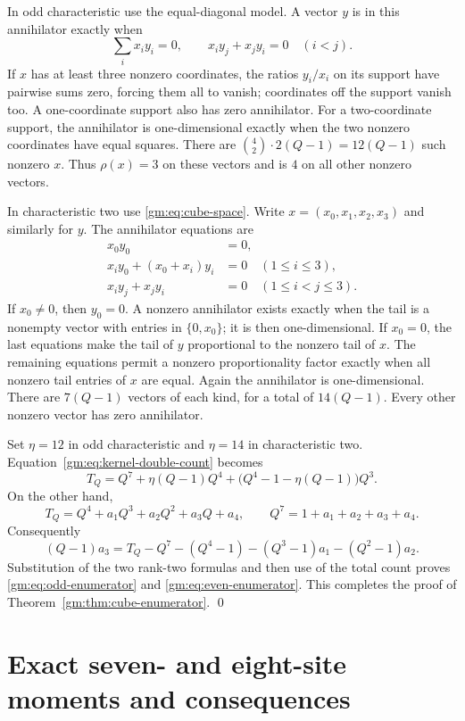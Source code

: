 \documentclass[11pt,a4paper]{article}
\numberwithin{equation}{section}
\theoremstyle{definition}
\theoremstyle{remark}
\newcommand{\1}{\mathbf 1}
\begin{document}
In odd characteristic use the equal-diagonal model. A vector $y$ is in
this annihilator exactly when
\[
 \sum_i x_i y_i=0,\qquad x_i y_j+x_j y_i=0\quad(i<j).
\]
If $x$ has at least three nonzero coordinates, the ratios $y_i/x_i$
on its support have pairwise sums zero, forcing them all to vanish;
coordinates off the support vanish too. A one-coordinate support also
has zero annihilator. For a two-coordinate support, the annihilator is
one-dimensional exactly when the two nonzero coordinates have equal
squares. There are $\binom42\cdot2(Q-1)=12(Q-1)$ such nonzero $x$.
Thus $\rho(x)=3$ on these vectors and is $4$ on all other nonzero vectors.

In characteristic two use \eqref{gm:eq:cube-space}. Write
$x=(x_0,x_1,x_2,x_3)$ and similarly for $y$. The annihilator equations are
\begin{align*}
 x_0y_0&=0,\\
 x_i y_0+(x_0+x_i)y_i&=0\quad(1\leq i\leq3),\\
 x_i y_j+x_j y_i&=0\quad(1\leq i<j\leq3).
\end{align*}
If $x_0\ne0$, then $y_0=0$. A nonzero annihilator exists exactly when the
tail is a nonempty vector with entries in $\{0,x_0\}$; it is then
one-dimensional. If $x_0=0$, the last equations make the tail of $y$
proportional to the nonzero tail of $x$. The remaining equations permit
a nonzero proportionality factor exactly when all nonzero tail entries
of $x$ are equal. Again the annihilator is one-dimensional. There are
$7(Q-1)$ vectors of each kind, for a total of $14(Q-1)$. Every other
nonzero vector has zero annihilator.

Set $\eta=12$ in odd characteristic and $\eta=14$ in characteristic two.
Equation~\eqref{gm:eq:kernel-double-count} becomes
\begin{equation}\label{gm:eq:kernel-moment-value}
 T_Q=Q^7+\eta(Q-1)Q^4+\bigl(Q^4-1-\eta(Q-1)\bigr)Q^3.
\end{equation}
On the other hand,
\[
 T_Q=Q^4+a_1Q^3+a_2Q^2+a_3Q+a_4,
 \qquad Q^7=1+a_1+a_2+a_3+a_4.
\]
Consequently
\begin{equation}\label{gm:eq:solve-rank-three}
 (Q-1)a_3=T_Q-Q^7-(Q^4-1)-(Q^3-1)a_1-(Q^2-1)a_2.
\end{equation}
Substitution of the two rank-two formulas and then use of the total count
proves \eqref{gm:eq:odd-enumerator} and \eqref{gm:eq:even-enumerator}.
This completes the proof of Theorem~\ref{gm:thm:cube-enumerator}.
\qed

\section{Exact seven- and eight-site moments and consequences}
\label{gm:sec:consequences}
\end{document}
